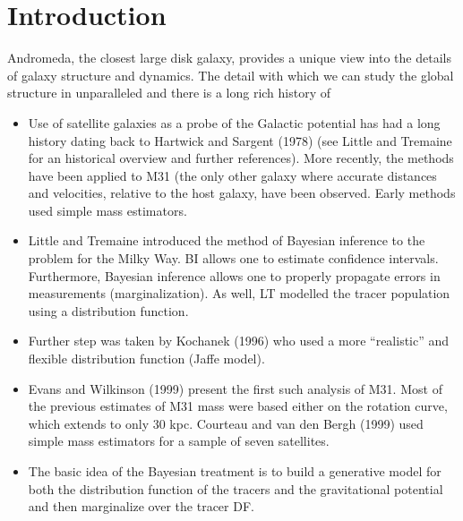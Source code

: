 \documentclass[preprint,12pt]{aastex}
\begin{document}



\section{Introduction}

Andromeda, the closest large disk galaxy, provides a unique
view into the details of galaxy structure and dynamics. The detail with
which we can study the global structure in unparalleled and there is
a long rich history of


\begin{itemize}

\item Use of satellite galaxies as a probe of the Galactic potential
has had a long history dating back to Hartwick and Sargent (1978) (see
Little and Tremaine for an historical overview and further
references).  More recently, the methods have been applied to M31 (the
only other galaxy where accurate distances and velocities, relative to
the host galaxy, have been observed.  Early methods used simple mass
estimators.

\item Little and Tremaine introduced the method of Bayesian inference
to the problem for the Milky Way.  BI allows one to estimate
confidence intervals.  Furthermore, Bayesian inference allows one to
properly propagate errors in measurements (marginalization).  As well,
LT modelled the tracer population using a distribution function.

\item Further step was taken by Kochanek (1996) who used a more ``realistic''
and flexible distribution function (Jaffe model).

\item Evans and Wilkinson (1999) present the first such analysis of
M31.  Most of the previous estimates of M31 mass were based either on
the rotation curve, which extends to only 30 kpc.  Courteau and van
den Bergh (1999) used simple mass estimators for a sample of seven
satellites.

\item The basic idea of the Bayesian treatment is to build a
generative model for both the distribution function of the tracers and
the gravitational potential and then marginalize over the tracer DF.

\end{itemize}
\end{document}
